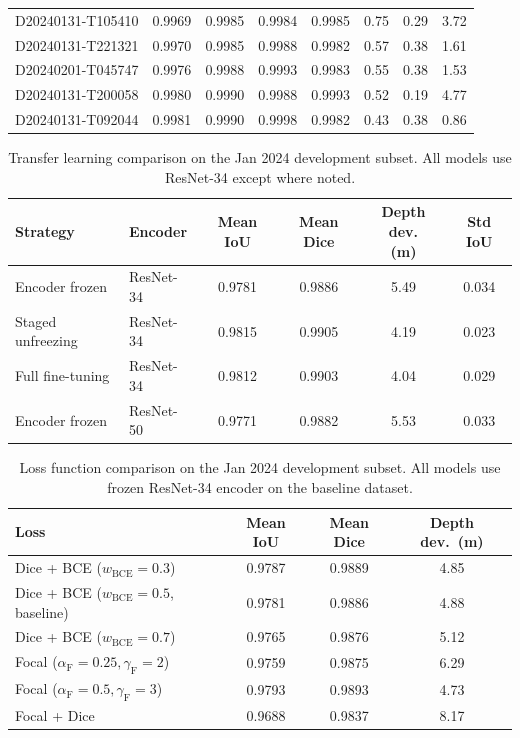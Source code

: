 \begin{table}[htbp]
{\begin{tabular}{lccccccc}
D20240131-T105410 & 0.9969 & 0.9985 & 0.9984 & 0.9985 &  0.75 &  0.29 &  3.72 \\
D20240131-T221321 & 0.9970 & 0.9985 & 0.9988 & 0.9982 &  0.57 &  0.38 &  1.61 \\
D20240201-T045747 & 0.9976 & 0.9988 & 0.9993 & 0.9983 &  0.55 &  0.38 &  1.53 \\
D20240131-T200058 & 0.9980 & 0.9990 & 0.9988 & 0.9993 &  0.52 &  0.19 &  4.77 \\
D20240131-T092044 & 0.9981 & 0.9990 & 0.9998 & 0.9982 &  0.43 &  0.38 &  0.86 \\
\bottomrule
\end{tabular}
}
\end{table}

\begin{table}[htbp]
\centering
\caption{Transfer learning comparison on the Jan 2024 development subset. All models use ResNet-34 except where noted.}
\label{tab:transfer}
\small
\begin{tabular}{llcccc}
\toprule
Strategy & Encoder & Mean IoU & Mean Dice & \makecell{Depth dev.\\(m)} & Std IoU \\
\midrule
Encoder frozen    & ResNet-34 & 0.9781 & 0.9886 & 5.49 & 0.034 \\
Staged unfreezing & ResNet-34 & 0.9815 & 0.9905 & 4.19 & 0.023 \\
Full fine-tuning  & ResNet-34 & 0.9812 & 0.9903 & 4.04 & 0.029 \\
Encoder frozen    & ResNet-50 & 0.9771 & 0.9882 & 5.53 & 0.033 \\
\bottomrule
\end{tabular}
\end{table}

\begin{table}[htbp]
\centering
\caption{Loss function comparison on the Jan 2024 development subset. All models use frozen ResNet-34 encoder on the baseline dataset.}
\label{tab:loss}
\begin{tabular}{lccc}
\toprule
Loss & Mean IoU & Mean Dice & Depth dev.\ (m) \\
\midrule
Dice + BCE ($w_\text{BCE}=0.3$)           & 0.9787 & 0.9889 & 4.85 \\
Dice + BCE ($w_\text{BCE}=0.5$, baseline)  & 0.9781 & 0.9886 & 4.88 \\
Dice + BCE ($w_\text{BCE}=0.7$)           & 0.9765 & 0.9876 & 5.12 \\
Focal ($\alpha_{\mathrm{F}}=0.25, \gamma_{\mathrm{F}}=2$)            & 0.9759 & 0.9875 & 6.29 \\
Focal ($\alpha_{\mathrm{F}}=0.5, \gamma_{\mathrm{F}}=3$)             & 0.9793 & 0.9893 & 4.73 \\
Focal + Dice                               & 0.9688 & 0.9837 & 8.17 \\
\bottomrule
\end{tabular}
\end{table}

